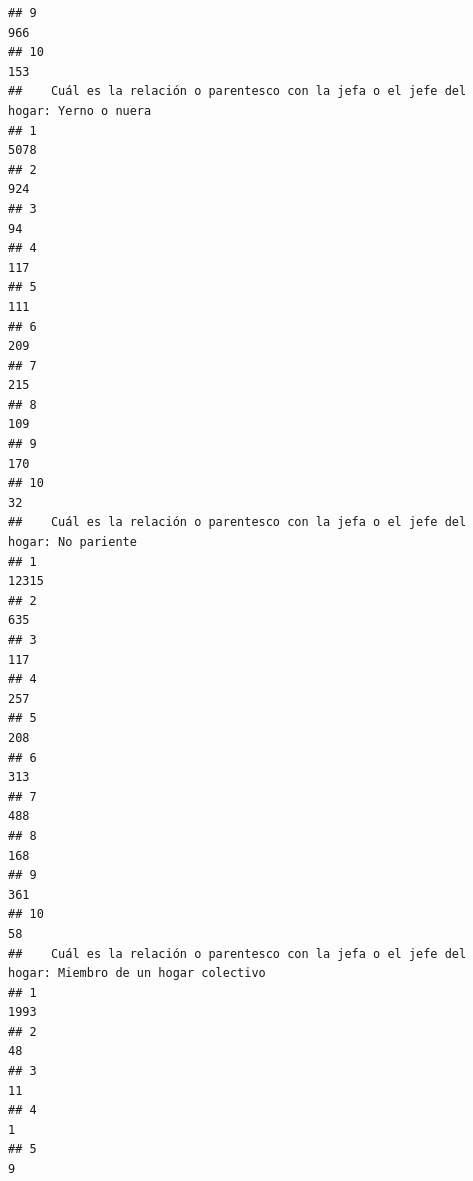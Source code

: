 \documentclass[11pt,]{article}
\begin{document}
\begin{verbatim}
## 9                                                                              966
## 10                                                                             153
##    Cuál es la relación o parentesco con la jefa o el jefe del hogar: Yerno o nuera
## 1                                                                             5078
## 2                                                                              924
## 3                                                                               94
## 4                                                                              117
## 5                                                                              111
## 6                                                                              209
## 7                                                                              215
## 8                                                                              109
## 9                                                                              170
## 10                                                                              32
##    Cuál es la relación o parentesco con la jefa o el jefe del hogar: No pariente
## 1                                                                          12315
## 2                                                                            635
## 3                                                                            117
## 4                                                                            257
## 5                                                                            208
## 6                                                                            313
## 7                                                                            488
## 8                                                                            168
## 9                                                                            361
## 10                                                                            58
##    Cuál es la relación o parentesco con la jefa o el jefe del hogar: Miembro de un hogar colectivo
## 1                                                                                             1993
## 2                                                                                               48
## 3                                                                                               11
## 4                                                                                                1
## 5                                                                                                9

\end{verbatim}
\end{document}
